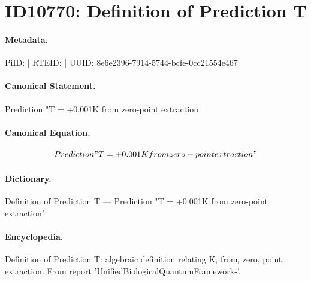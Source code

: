 \section*{ID10770: Definition of Prediction T}
\paragraph{Metadata.}
PiID:  | RTEID:  | UUID: 8e6e2396-7914-5744-bcfe-0cc21554e467

\paragraph{Canonical Statement.}
Prediction "T = +0.001K from zero-point extraction

\paragraph{Canonical Equation.}
\[
Prediction  "T = +0.001K from zero-point extraction"
\]

\paragraph{Dictionary.}
Definition of Prediction T — Prediction  "T = +0.001K from zero-point extraction"

\paragraph{Encyclopedia.}
Definition of Prediction T: algebraic definition relating K, from, zero, point, extraction. From report 'UnifiedBiologicalQuantumFramework-'.
